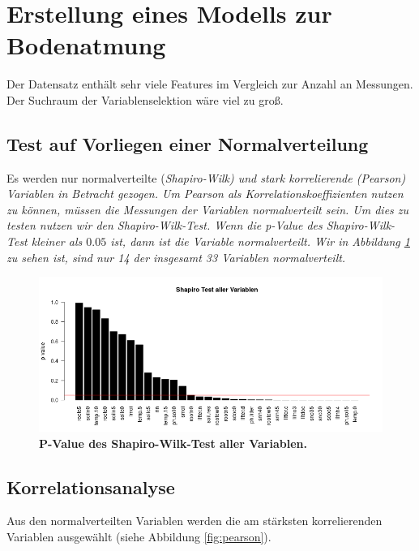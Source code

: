 \section{Erstellung eines Modells zur Bodenatmung}
\label{sec-model}

Der Datensatz enthält sehr viele Features im Vergleich zur Anzahl an Messungen. Der Suchraum der Variablenselektion wäre viel zu groß.

\subsection{Test auf Vorliegen einer Normalverteilung}

Es werden nur normalverteilte (\it{Shapiro-Wilk}) und stark korrelierende (\it{Pearson}) Variablen in Betracht gezogen. Um \it{Pearson} als Korrelationskoeffizienten nutzen zu können, müssen die Messungen der Variablen normalverteilt sein. Um dies zu testen nutzen wir den \it{Shapiro-Wilk-Test}. Wenn die \it{p-Value} des \it{Shapiro-Wilk-Test} kleiner als $0.05$ ist, dann ist die Variable normalverteilt. Wir in Abbildung \ref{fig:shapiro} zu sehen ist, sind nur 14 der insgesamt 33 Variablen normalverteilt.

\begin{figure}[ht]
	\centering
	\includegraphics[width=\textwidth]{fig/model/normalverteilung-shapiro.png}
	\caption{\bf{P-Value des Shapiro-Wilk-Test aller Variablen.}}
	\label{fig:shapiro}
\end{figure}

\subsection{Korrelationsanalyse}

Aus den normalverteilten Variablen werden die am stärksten korrelierenden Variablen ausgewählt (siehe Abbildung \ref{fig:pearson}). 

